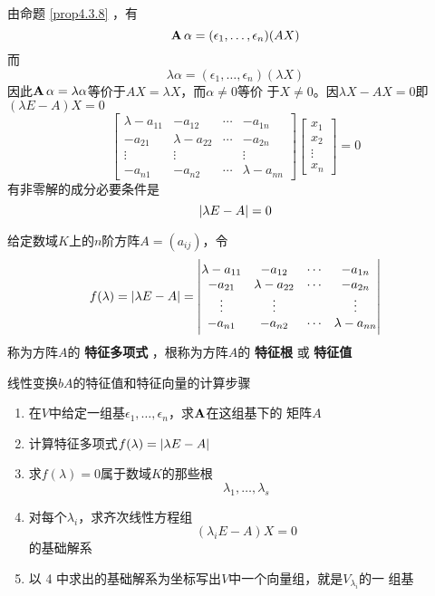 \documentclass[11pt]{article}
\begin{document}
由命题 \ref{prop4.3.8} ，有
\begin{equation*}
\operatorname{\textbf{A}}\alpha=(\epsilon_1,\dots,\epsilon_n)(AX)
\end{equation*}
而
\begin{equation*}
\lambda\alpha=(\epsilon_1,\dots,\epsilon_n)(\lambda X)
\end{equation*}
因此\(\operatorname{\textbf{A}}\alpha=\lambda\alpha\)等价于\(AX=\lambda X\)，而\(\alpha\neq0\)等价
于\(X\neq0\)。因\(\lambda X-AX=0\)即\((\lambda E-A)X=0\)
\begin{equation*}
\begin{bmatrix}
\lambda-a_{11}&-a_{12}&\cdots&-a_{1n}\\
-a_{21}&\lambda-a_{22}&\cdots&-a_{2n}\\
\vdots&\vdots&&\vdots\\
-a_{n1}&-a_{n2}&\cdots&\lambda-a_{nn}
\end{bmatrix}
\begin{bmatrix}
x_1\\x_2\\\vdots\\x_n
\end{bmatrix}=0
\end{equation*}
有非零解的成分必要条件是
\begin{equation*}
\abs{\lambda E-A}=0
\end{equation*}

给定数域\(K\)上的\(n\)阶方阵\(A=(a_{ij})\)，令
\begin{equation*}
f(\lambda)=\abs{\lambda E-A}=
\begin{vmatrix}
\lambda-a_{11}&-a_{12}&\cdots&-a_{1n}\\
-a_{21}&\lambda-a_{22}&\cdots&-a_{2n}\\
\vdots&\vdots&&\vdots\\
-a_{n1}&-a_{n2}&\cdots&\lambda-a_{nn}
\end{vmatrix}
\end{equation*}
称为方阵\(A\)的 \textbf{特征多项式} ，根称为方阵\(A\)的 \textbf{特征根} 或 \textbf{特征值}


线性变换\(bA\)的特征值和特征向量的计算步骤
\begin{enumerate}
\item 在\(V\)中给定一组基\(\epsilon_1,\dots,\epsilon_n\)，求\(\operatorname{\textbf{A}}\)在这组基下的
矩阵\(A\)
\item 计算特征多项式\(f(\lambda)=\abs{\lambda E-A}\)
\item 求\(f(\lambda)=0\)属于数域\(K\)的那些根
\begin{equation*}
\lambda_1,\dots,\lambda_s
\end{equation*}
\item 对每个\(\lambda_i\)，求齐次线性方程组
\begin{equation*}
(\lambda_i E-A)X=0
\end{equation*}
的基础解系
\item 以 4 中求出的基础解系为坐标写出\(V\)中一个向量组，就是\(V_{\lambda_i}\)的一
组基
\end{enumerate}
\end{document}

